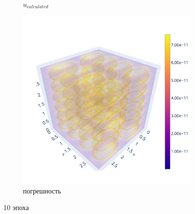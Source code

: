 \documentclass[a4paper,hidelinks,12pt]{article}
\begin{document}
\begin{figure}[H]
\begin{subfigure}{.33\textwidth}
  \caption{$u_{calculated}$}
\end{subfigure}%
\begin{subfigure}{.33\textwidth}
  \centering
  \includegraphics[width=\linewidth]{pictures/10_L1_256_diff.png}
  \caption{погрешность}
\end{subfigure}%
\caption{10 эпоха}
\label{fig:fig}
\end{figure}
\end{document}
